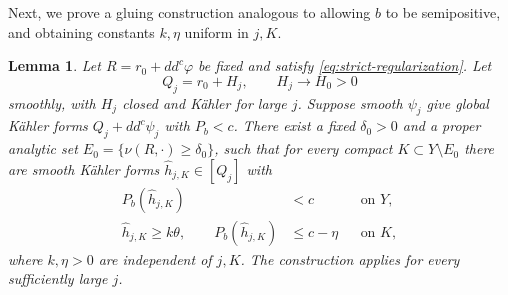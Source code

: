 \documentclass[reqno]{amsart}
\theoremstyle{remark}
\theoremstyle{plain}
\newtheorem{lemma}[thm]{Lemma}
\begin{document}
Next, we prove a gluing construction analogous to \cite[Lemma4.2]{SSD} allowing $b$ to be semipositive, and obtaining constants  $k, \eta$ uniform in $j,K$.
\begin{samepage}
\begin{lemma}\label{lem:gluing}
Let \(R=r_0+dd^c\varphi\) be fixed and satisfy \eqref{eq:strict-regularization}. Let
\[
Q_j=r_0+H_j,\qquad H_j\longrightarrow H_0>0
\]
smoothly, with \(H_j\) closed and K\"ahler for large \(j\). Suppose smooth \(\psi_j\) give global K\"ahler forms \(Q_j+dd^c\psi_j\) with \(P_b<c\). There exist a fixed \(\delta_0>0\) and a proper analytic set \(E_0=\{\nu(R,\cdot)\ge\delta_0\}\), such that for every compact \(K\subset Y\setminus E_0\) there are smooth K\"ahler forms \(\widehat h_{j,K}\in[Q_j]\) with
\begin{equation}\label{eq:glued-forms}
\begin{aligned}
P_b(\widehat h_{j,K})&<c &&\text{on }Y,\\
\widehat h_{j,K}\ge k\theta,\qquad
P_b(\widehat h_{j,K})&\le c-\eta &&\text{on }K,
\end{aligned}
\end{equation}
where \(k,\eta>0\) are independent of \(j,K\). The construction applies for every sufficiently large \(j\). 
\end{lemma}
\end{samepage}
\end{document}

